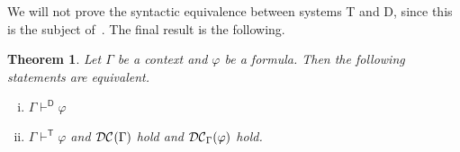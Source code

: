 \documentclass{article}
\newtheorem{theorem}[definition]{Theorem}
\newtheorem{proposition}[definition]{Proposition}
\newcommand{\D}{\textsf D}
\newcommand{\T}{\textsf T}
\newcommand{\starfun}[1]{\ensuremath{{#1}^\ast}}
\newcommand{\ok}{\mbox{\em wf}}
\newcommand{\wf}{\ \mbox{\em wf}}
\newcommand{\myvdash}[1]{\ensuremath{\vdash^{\mathsf{#1}}}}
\newcommand{\synDC}[1][{}]{\ifthenelse{\equal{#1}{}}{%
{\ensuremath{{\cal{DC}}}}}{%
{\ensuremath{{\cal{DC}}_{#1}}}}}
\begin{document}
We will not prove the syntactic equivalence between systems {\T}
and {\D}, since this is the subject of~\cite{wie:zwa:03}.  The
final result is the following.
\begin{theorem}\label{TequivD}
Let $\Gamma$ be a context and $\varphi$ be a formula.  Then the
following statements are equivalent.
\begin{enumerate}[(i)]
\item $\Gamma\myvdash{D}\varphi$
\item $\Gamma\myvdash{T}\varphi$ and $\synDC{}(\Gamma)$ hold and
$\synDC[{\Gamma}](\varphi)$ hold.
\end{enumerate}
\end{theorem}




\end{document}
